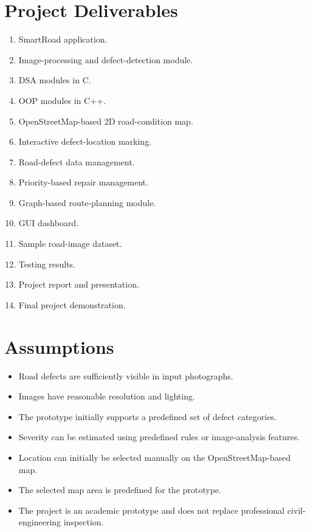 \documentclass[12pt,a4paper]{article}
\begin{document}
\section{Project Deliverables}

\begin{enumerate}[leftmargin=*]
    \item SmartRoad application.
    \item Image-processing and defect-detection module.
    \item DSA modules in C.
    \item OOP modules in C++.
    \item OpenStreetMap-based 2D road-condition map.
    \item Interactive defect-location marking.
    \item Road-defect data management.
    \item Priority-based repair management.
    \item Graph-based route-planning module.
    \item GUI dashboard.
    \item Sample road-image dataset.
    \item Testing results.
    \item Project report and presentation.
    \item Final project demonstration.
\end{enumerate}

\section{Assumptions}

\begin{itemize}[leftmargin=*]
    \item Road defects are sufficiently visible in input photographs.
    \item Images have reasonable resolution and lighting.
    \item The prototype initially supports a predefined set of defect categories.
    \item Severity can be estimated using predefined rules or image-analysis features.
    \item Location can initially be selected manually on the OpenStreetMap-based map.
    \item The selected map area is predefined for the prototype.
    \item The project is an academic prototype and does not replace professional civil-engineering inspection.
\end{itemize}
\end{document}
